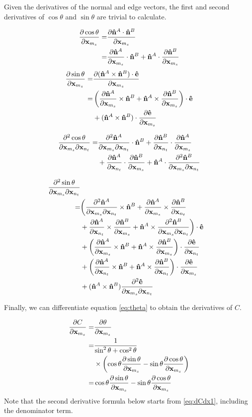 \documentclass[twocolumn]{article}
\newcommand{\twocolumnonly}[1]{#1}
\newcommand{\twocolbreak}{\twocolumnonly{\notag \\}}
\newcommand{\twocolbreakal}{\twocolumnonly{\notag \\&}}
\newcommand{\pfrac}[2]{
    \frac{\partial #1}{\partial #2}
}
\newcommand{\pfractwo}[3]{
    \frac{\partial^2 #1}{\partial #2 \partial #3}
}
\newcommand{\cross}{\times}
\newcommand{\x}{{\bf x}}
\newcommand{\xms}{\x_{m_s}}
\newcommand{\xnt}{\x_{n_t}}
\newcommand{\nhat}{{\bf {\hat n}}}
\newcommand{\ehat}{{\bf {\hat e}}}
\begin{document}
Given the derivatives of the normal and edge vectors, the first and second
derivatives of $\cos \theta$ and $\sin \theta$ are trivial to calculate.

\begin{align}
\pfrac{ \cos \theta }{\xms} =&
\pfrac{ \nhat^A \cdot \nhat^B }{\xms} \\
=&
   \pfrac{\nhat^A}{\xms} \cdot \nhat^B +
   \nhat^A \cdot \pfrac{\nhat^B}{\xms}
\end{align}
\begin{align}
\pfrac{ \sin \theta }{\xms} =&
\pfrac{ (\nhat^A \cross \nhat^B) \cdot \ehat}{\xms} \\
=&
   \left(
       \pfrac{\nhat^A}{\xms} \cross \nhat^B +
       \nhat^A \cross \pfrac{\nhat^B}{\xms}
   \right) \cdot \ehat \twocolbreakal +
   (\nhat^A \cross \nhat^B) \cdot \pfrac{\ehat}{\xms}
\end{align}

\begin{align}
\pfractwo{\cos \theta}{\xms}{\xnt} =&
   \pfractwo{\nhat^A}{\xms}{\xnt} \cdot \nhat^B + 
   \pfrac{\nhat^B}{\xnt} \cdot \pfrac{\nhat^A}{\xms} \twocolbreakal +
   \pfrac{\nhat^A}{\xnt} \cdot \pfrac{\nhat^B}{\xms} + 
   \nhat^A \cdot \pfractwo{\nhat^B}{\xms}{\xnt}
\end{align}

\begin{align}
%
\pfractwo{\sin \theta}{\xms}{\xnt} \twocolbreak =&
   \bigg(
       \pfractwo{\nhat^A}{\xms}{\xnt} \cross \nhat^B +
       \pfrac{\nhat^A}{\xms} \cross \pfrac{\nhat^B}{\xnt} \notag \\& +
       \pfrac{\nhat^A}{\xnt} \cross \pfrac{\nhat^B}{\xms} +
       \nhat^A \cross \pfractwo{\nhat^B}{\xms}{\xnt}
   \bigg) \cdot \ehat    \notag\\& +
   \left(
       \pfrac{\nhat^A}{\xms} \cross \nhat^B +
       \nhat^A \cross \pfrac{\nhat^B}{\xms}
   \right) \cdot \pfrac{\ehat}{\xnt} \notag \\&+
   \left(
       \pfrac{\nhat^A}{\xnt} \cross \nhat^B +
       \nhat^A \cross \pfrac{\nhat^B}{\xnt}
   \right) \cdot \pfrac{\ehat}{\xms} \notag \\& +
   (\nhat^A \cross \nhat^B) \pfractwo{\ehat}{\xms}{\xnt}
\end{align}

Finally, we can differentiate equation \eqref{eq:theta} to obtain the
derivatives of $C$.

\begin{align}
\pfrac{C}{\xms} =& \pfrac{\theta}{\xms} \\
\label{eq:dCdx1}
=& \frac{1}{\sin^2 \theta + \cos^2 \theta} \twocolbreakal
   \times \left(\cos \theta \pfrac{\sin \theta}{\xms} -
                \sin \theta \pfrac{\cos \theta}{\xms}\right) \\
\label{eq:dCdx2}
=& \cos \theta \pfrac{\sin \theta}{\xms} -
   \sin \theta \pfrac{\cos \theta}{\xms}
\end{align}
Note that the second derivative formula below starts from \eqref{eq:dCdx1},
including the denominator term.
\end{document}

